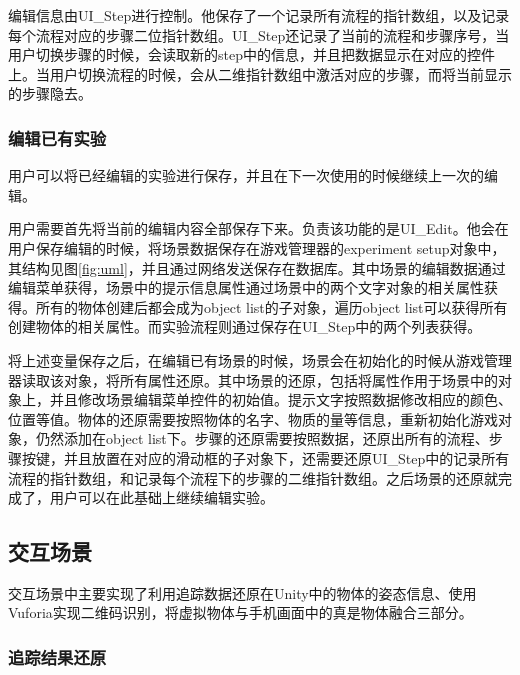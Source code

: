 编辑信息由UI\_Step进行控制。他保存了一个记录所有流程的指针数组，以及记录每个流程对应的步骤二位指针数组。UI\_Step还记录了当前的流程和步骤序号，当用户切换步骤的时候，会读取新的step中的信息，并且把数据显示在对应的控件上。当用户切换流程的时候，会从二维指针数组中激活对应的步骤，而将当前显示的步骤隐去。


\subsubsection{编辑已有实验}
用户可以将已经编辑的实验进行保存，并且在下一次使用的时候继续上一次的编辑。

用户需要首先将当前的编辑内容全部保存下来。负责该功能的是UI\_Edit。他会在用户保存编辑的时候，将场景数据保存在游戏管理器的experiment setup对象中，其结构见图\ref{fig:uml}，并且通过网络发送保存在数据库。其中场景的编辑数据通过编辑菜单获得，场景中的提示信息属性通过场景中的两个文字对象的相关属性获得。所有的物体创建后都会成为object list的子对象，遍历object list可以获得所有创建物体的相关属性。而实验流程则通过保存在UI\_Step中的两个列表获得。

将上述变量保存之后，在编辑已有场景的时候，场景会在初始化的时候从游戏管理器读取该对象，将所有属性还原。其中场景的还原，包括将属性作用于场景中的对象上，并且修改场景编辑菜单控件的初始值。提示文字按照数据修改相应的颜色、位置等值。物体的还原需要按照物体的名字、物质的量等信息，重新初始化游戏对象，仍然添加在object list下。步骤的还原需要按照数据，还原出所有的流程、步骤按键，并且放置在对应的滑动框的子对象下，还需要还原UI\_Step中的记录所有流程的指针数组，和记录每个流程下的步骤的二维指针数组。之后场景的还原就完成了，用户可以在此基础上继续编辑实验。

\subsection{交互场景}
交互场景中主要实现了利用追踪数据还原在Unity中的物体的姿态信息、使用Vuforia实现二维码识别，将虚拟物体与手机画面中的真是物体融合三部分。

\subsubsection{追踪结果还原}

